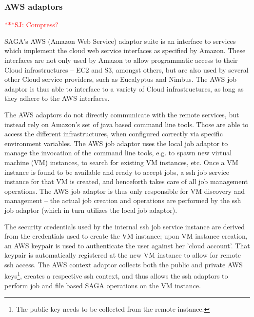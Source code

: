\documentclass[3p,twocolumn]{elsarticle}
\newcommand{\jhanote}[1]{ {\textcolor{red} { ***SJ: #1 }}}
\newcommand{\jhanote}[1]{}
\begin{document}
\subsubsection{AWS adaptors} 

\jhanote{Compress?}

SAGA's AWS (Amazon Web Service) adaptor suite is
an interface to services which implement the cloud web service
interfaces as specified by Amazon. %
These interfaces are not only used by Amazon to allow programmatic
access to their Cloud infrastructures -- EC2 and S3, amongst others,
but are also used by several other Cloud service providers, such as
Eucalyptus\cite{eucalyptus} and Nimbus.  The AWS job adaptor is thus able to
interface to a variety of Cloud infrastructures, as long as they
adhere to the AWS interfaces.

The AWS adaptors do not directly communicate with the remote services,
but instead rely on Amazon's set of java based command line tools.
Those are able to access the different infrastructures, when configured
correctly via specific environment variables.  The AWS job adaptor
uses the local job adaptor to manage the invocation of the command
line tools, e.g. to spawn new virtual machine (VM) instances, to
search for existing VM instances, etc.  Once a VM instance is found to
be available and ready to accept jobs, a ssh job service instance for
that VM is created, and henceforth takes care of all job management
operations.  The AWS job adaptor is thus only responsible for VM
discovery and management -- the actual job creation and operations are
performed by the ssh job adaptor (which in turn utilizes the local job
adaptor).

The security credentials used by the internal ssh job service
instance are derived from the credentials used to create 
the VM instance; upon VM instance creation, an AWS keypair is
used to authenticate the user against her 'cloud account'.  That
keypair is automatically registered at the new VM instance to allow
for remote ssh access.  The AWS context adaptor collects both the
public and private AWS keys\footnote{The public key needs to be
  collected from the remote instance.}, creates a respective ssh
context, and thus allows the ssh adaptors to perform job and file
based SAGA operations on the VM instance.
\end{document}
